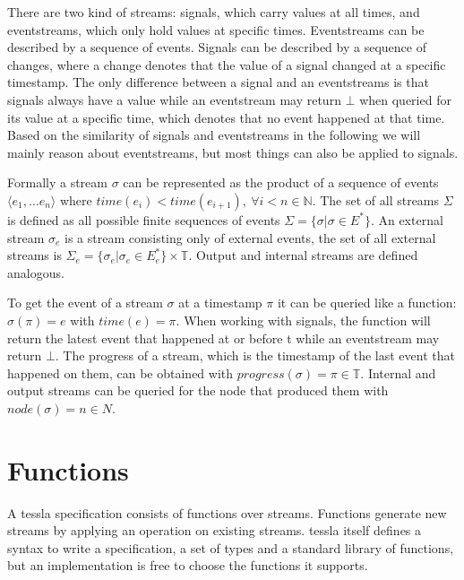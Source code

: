 There are two kind of streams: signals, which carry values at all times, and event\-streams, which only hold values at specific times.
Eventstreams can be described by a sequence of events.
Signals can be described by a sequence of changes, where a change denotes that the value of a signal changed at a specific timestamp.
The only difference between a signal and an eventstreams is that signals always have a value while an eventstream may return \(\bot\) when queried for its value at a specific time, which denotes that no event happened at that time.
Based on the similarity of signals and eventstreams in the following we will mainly reason about eventstreams, but most things can also be applied to signals.

Formally a stream \(\sigma\) can be represented as the product of a sequence of events \(\langle e_1, \dots e_n\rangle\) where \(\mathit{time}(e_i) < \mathit{time}(e_{i+1}),\ \forall i < n \in \mathbb{N}\).
The set of all streams \(\Sigma\) is defined as all possible finite sequences of events \(\Sigma = \{\sigma | \sigma \in E^* \}\).
An external stream \(\sigma_e\) is a stream consisting only of external events, the set of all external streams is \(\Sigma_e = \{\sigma_e | \sigma_e \in E_e^*\} \times \mathbb{T}\).
Output and internal streams are defined analogous.

To get the event of a stream \(\sigma\) at a timestamp \(\pi\) it can be queried like a function: \(\sigma(\pi) = e\) with \(\mathit{time}(e) = \pi \).
When working with signals, the function will return the latest event that happened at or before t while an eventstream may return \(\bot\).
The progress of a stream, which is the timestamp of the last event that happened on them, can be obtained with \(\mathit{progress}(\sigma) = \pi \in \mathbb{T}\).
Internal and output streams can be queried for the node that produced them with \(\mathit{node}(\sigma) = n \in N\).

\section{Functions}
\label{sec:definitions:functions}

A \gls{tessla} specification consists of functions over streams.
Functions generate new streams by applying an operation on existing streams.
\gls{tessla} itself defines a syntax to write a specification, a set of types and a standard library of functions, but an implementation is free to choose the functions it supports.

